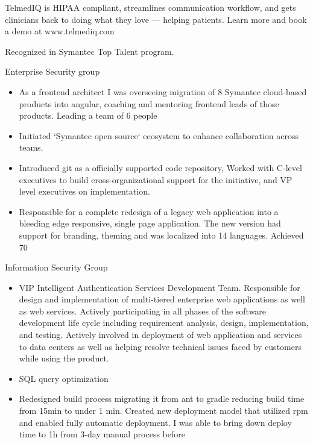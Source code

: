 \documentclass[11pt,a4paper,roman]{moderncv}       %
\begin{document}
TelmedIQ is HIPAA compliant, streamlines communication workflow, and gets clinicians back to doing what they love — helping patients. Learn more and book a demo at www.telmediq.com

\vspace{16pt}


Recognized in Symantec Top Talent program.


Enterprise Security group
\begin{itemize}
    \item As a frontend architect I was overseeing migration of 8 Symantec cloud-based products into angular, coaching and mentoring frontend leads of those products. Leading a team of 6 people
    \item Initiated `Symantec open source` ecosystem to enhance collaboration across teams. 
    \item Introduced git as a officially supported code repository, Worked with C-level executives to build cross-organizational support for the initiative, and VP level executives on implementation.
    \item Responsible for a complete redesign of a legacy web application into a bleeding edge responsive, single page application. The new version had support for branding, theming and was localized into 14 languages. Achieved 70%
\end{itemize}


Information Security Group

\begin{itemize}
    \item VIP Intelligent Authentication Services Development Team. Responsible for design and implementation of multi-tiered enterprise web applications as well as web services. Actively participating in all phases of the software development life cycle including requirement analysis, design, implementation, and testing. Actively involved in deployment of web application and services to data centers as well as helping resolve technical issues faced by customers while using the product.
    \item SQL query optimization
    \item Redesigned build process migrating it from ant to gradle reducing build time from 15min to under 1 min. Created new deployment model that utilized rpm and enabled fully automatic deployment. I was able to bring down deploy time to 1h from 3-day manual process before
\end{itemize}
\end{document}
